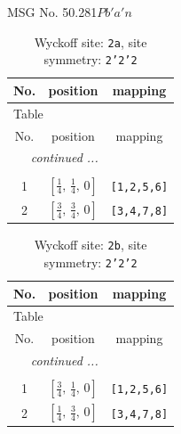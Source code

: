 \documentclass[fleqn,8pt]{jsarticle}
\begin{document}
\setcounter{MaxMatrixCols}{32}

\renewcommand{\tablename}{Table~}
\renewcommand{\figurename}{Figure~}
\begin{center}
\LARGE
MSG No. 50.281\quad$Pb'a'n$
\end{center}
\renewcommand{\arraystretch}{1.2}
\begin{longtable}{ccc}
\caption{Wyckoff site: {\tt 2a}, site symmetry: {\tt 2'2'2}}
 \\
 \hline \hline
No. & position & mapping \\ \hline \endfirsthead

\multicolumn{2}{l}{\tablename\ \thetable{}} \\
 \hline \hline
No. & position & mapping \\ \hline \endhead

 \hline \hline
\multicolumn{2}{r}{\footnotesize\it continued ...} \\ \endfoot

 \hline \hline
\multicolumn{2}{r}{} \\ \endlastfoot

1 & $\left[ \frac{1}{4},\, \frac{1}{4},\, 0 \right]$ & {\tt [1,2,5,6]} \\ \hline
2 & $\left[ \frac{3}{4},\, \frac{3}{4},\, 0 \right]$ & {\tt [3,4,7,8]} \\
\end{longtable}
\renewcommand{\arraystretch}{1.2}
\begin{longtable}{ccc}
\caption{Wyckoff site: {\tt 2b}, site symmetry: {\tt 2'2'2}}
 \\
 \hline \hline
No. & position & mapping \\ \hline \endfirsthead

\multicolumn{2}{l}{\tablename\ \thetable{}} \\
 \hline \hline
No. & position & mapping \\ \hline \endhead

 \hline \hline
\multicolumn{2}{r}{\footnotesize\it continued ...} \\ \endfoot

 \hline \hline
\multicolumn{2}{r}{} \\ \endlastfoot

1 & $\left[ \frac{3}{4},\, \frac{1}{4},\, 0 \right]$ & {\tt [1,2,5,6]} \\ \hline
2 & $\left[ \frac{1}{4},\, \frac{3}{4},\, 0 \right]$ & {\tt [3,4,7,8]} \\
\end{longtable}
\end{document}
